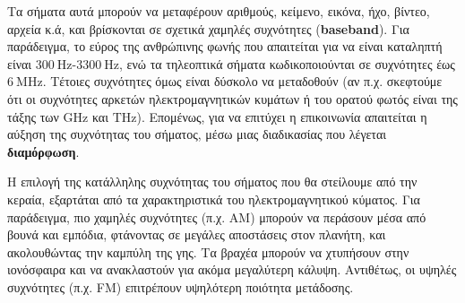 \documentclass[11pt,a4paper,notitlepage,fleqn]{article}
\begin{document}
Τα σήματα αυτά μπορούν να μεταφέρουν αριθμούς, κείμενο, εικόνα, ήχο, βίντεο, αρχεία κ.ά, και
βρίσκονται σε σχετικά χαμηλές συχνότητες (\textbf{baseband}). Για παράδειγμα, το εύρος της ανθρώπινης φωνής που
απαιτείται για να είναι καταληπτή είναι \( 300 \ \mathrm{Hz} \)-\( 3300\ \mathrm{Hz} \), ενώ
τα τηλεοπτικά σήματα κωδικοποιούνται σε συχνότητες έως \( 6 \ \mathrm{MHz} \). Τέτοιες
συχνότητες όμως είναι δύσκολο να μεταδοθούν (αν π.χ. σκεφτούμε ότι οι συχνότητες αρκετών
ηλεκτρομαγνητικών κυμάτων ή του ορατού φωτός είναι της τάξης των \( \mathrm{GHz} \) και
\( \mathrm{THz} \)). Επομένως, για να επιτύχει η επικοινωνία απαιτείται η αύξηση της
συχνότητας του σήματος, μέσω μιας διαδικασίας που λέγεται \textbf{διαμόρφωση}.


Η επιλογή της κατάλληλης συχνότητας του σήματος που θα στείλουμε από την κεραία, εξαρτάται
από τα χαρακτηριστικά του ηλεκτρομαγνητικού κύματος. Για παράδειγμα, πιο χαμηλές συχνότητες
(π.χ. AM) μπορούν να περάσουν μέσα από βουνά και εμπόδια, φτάνοντας σε μεγάλες αποστάσεις
στον πλανήτη, και ακολουθώντας την καμπύλη της γης. Τα βραχέα μπορούν να χτυπήσουν στην
ιονόσφαιρα και να ανακλαστούν για ακόμα μεγαλύτερη κάλυψη. Αντιθέτως, οι υψηλές συχνότητες
(π.χ. FM) επιτρέπουν υψηλότερη ποιότητα μετάδοσης.
\end{document}
